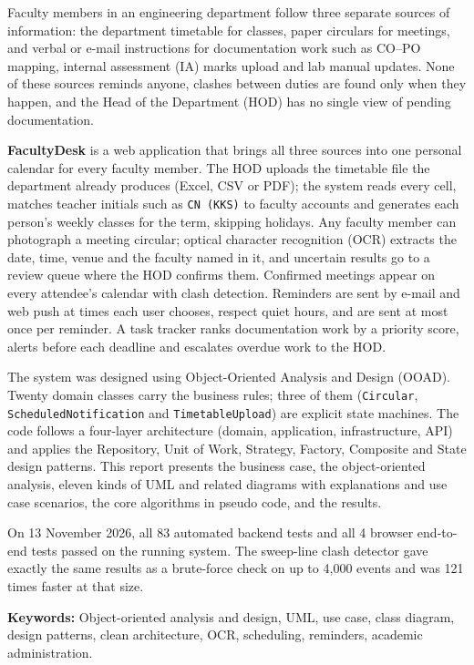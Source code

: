 
Faculty members in an engineering department follow three separate sources of information: the department timetable for classes, paper circulars for meetings, and verbal or e-mail instructions for documentation work such as CO--PO mapping, internal assessment (IA) marks upload and lab manual updates. None of these sources reminds anyone, clashes between duties are found only when they happen, and the Head of the Department (HOD) has no single view of pending documentation.

\textbf{FacultyDesk} is a web application that brings all three sources into one personal calendar for every faculty member. The HOD uploads the timetable file the department already produces (Excel, CSV or PDF); the system reads every cell, matches teacher initials such as \texttt{CN (KKS)} to faculty accounts and generates each person's weekly classes for the term, skipping holidays. Any faculty member can photograph a meeting circular; optical character recognition (OCR) extracts the date, time, venue and the faculty named in it, and uncertain results go to a review queue where the HOD confirms them. Confirmed meetings appear on every attendee's calendar with clash detection. Reminders are sent by e-mail and web push at times each user chooses, respect quiet hours, and are sent at most once per reminder. A task tracker ranks documentation work by a priority score, alerts before each deadline and escalates overdue work to the HOD.

The system was designed using Object-Oriented Analysis and Design (OOAD). Twenty domain classes carry the business rules; three of them (\texttt{Circular}, \texttt{ScheduledNotification} and \texttt{TimetableUpload}) are explicit state machines. The code follows a four-layer architecture (domain, application, infrastructure, API) and applies the Repository, Unit of Work, Strategy, Factory, Composite and State design patterns. This report presents the business case, the object-oriented analysis, eleven kinds of UML and related diagrams with explanations and use case scenarios, the core algorithms in pseudo code, and the results.

On 13 November 2026, all 83 automated backend tests and all 4 browser end-to-end tests passed on the running system. The sweep-line clash detector gave exactly the same results as a brute-force check on up to 4{,}000 events and was 121 times faster at that size.

\vspace{0.5cm}
\noindent\textbf{Keywords:} Object-oriented analysis and design, UML, use case, class diagram, design patterns, clean architecture, OCR, scheduling, reminders, academic administration.

